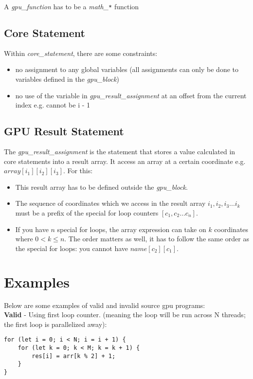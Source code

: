 A \textit{gpu\_function} has to be a \textit{math\_\texttt{*}} function

\subsection*{Core Statement}

Within \textit{core\_statement}, there are some constraints:

\begin{itemize}
    \item{no assignment to any global variables (all assignments can only be done to variables defined in the \textit{gpu\_block}})
    \item{no use of the variable in \textit{gpu\_result\_assignment} at an offset from the current index e.g. cannot be i - 1}
\end{itemize}

\subsection*{GPU Result Statement}

The \textit{gpu\_result\_assignment} is the statement that stores a value calculated in core statements into a result array. 
It access an array at a certain coordinate e.g. ${array[{i_1}][{i_2}][{i_3}]}$. For this:

\begin{itemize}
    \item{This result array has to be defined outside the \textit{gpu\_block}.}
    \item{The sequence of coordinates which we access in the result array ${{i_1}, {i_2}, {i_3} ... i_{k}}$ must be a 
        prefix of the special for loop counters ${[c_1,c_2 ... c_n]}$.}
    \item{ If you have ${n}$ special for loops, the array expression can take on ${k}$ coordinates where ${0 < k \leq n}$. 
    The order matters as well, it has to follow the same order as the special for loops: you cannot have ${name[c_2][c_1]}$.}
\end{itemize}

\section*{Examples}

Below are some examples of valid and invalid source gpu programs:\\

\textbf{Valid} - Using first loop counter. (meaning the loop will be run across N threads; the first loop is parallelized away):
\begin{verbatim}
for (let i = 0; i < N; i = i + 1) {
    for (let k = 0; k < M; k = k + 1) {
        res[i] = arr[k % 2] + 1;
    }
}
\end{verbatim}


